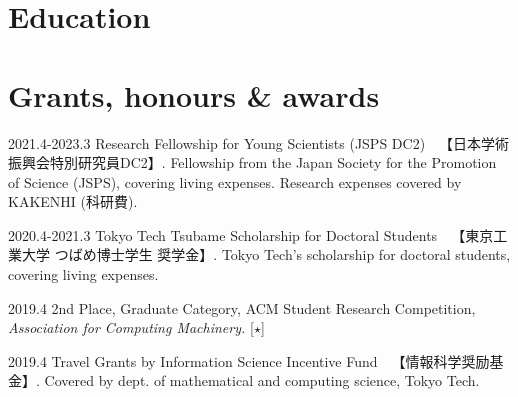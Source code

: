 \documentclass[11pt]{article} %
\newcommand{\伊澤侑祐}{\underline{伊澤侑祐}}
\begin{document}




\section*{Education}




\section*{Grants, honours \& awards}

\grant
{2021.4-2023.3}
{Research Fellowship for Young Scientists (JSPS DC2)~~【日本学術振興会特別研究員DC2】.}
{Fellowship from the Japan Society for the Promotion of Science (JSPS), covering
  living expenses. Research expenses covered by KAKENHI (科研費).}


\grant
{2020.4-2021.3}
{Tokyo Tech Tsubame Scholarship for Doctoral Students~~【東京工業大学 つばめ博士学生
  奨学金】.}
{Tokyo Tech's scholarship for doctoral students, covering living expenses.}

\grant
{2019.4}
{2nd Place, Graduate Category, ACM Student Research Competition, \textit{Association for Computing Machinery.}
  [$\star$]}
{}

\grant
{2019.4}
{Travel Grants by Information Science Incentive Fund~~【情報科学奨励基金】.}
{Covered by dept. of mathematical and computing science, Tokyo Tech.}
\end{document}
